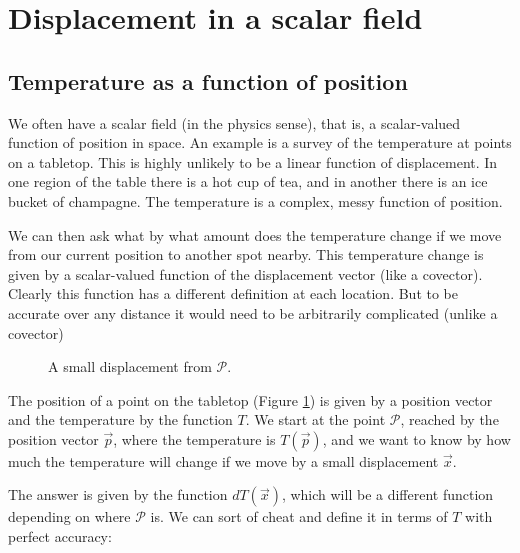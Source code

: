 \section{Displacement in a scalar field}

\subsection{Temperature as a function of position}

We often have a scalar field (in the physics sense), that is, a scalar-valued function of position in space. An example is a survey of the temperature at points on a tabletop. This is highly unlikely to be a linear function of displacement. In one region of the table there is a hot cup of tea, and in another there is an ice bucket of champagne. The temperature is a complex, messy function of position.

We can then ask what by what amount does the temperature change if we move from our current position to another spot nearby. This temperature change is given by a scalar-valued function of the displacement vector (like a covector). Clearly this function has a different definition at each location. But to be accurate over any distance it would need to be arbitrarily complicated (unlike a covector)

\begin{figure}[h]
    \centering
    \caption{A small displacement from $\mathcal{P}$.} \label{fig:vector-displacement}
\end{figure}

The position of a point on the tabletop (Figure \ref{fig:vector-displacement}) is given by a position vector and the temperature by the function $T$. We start at the point $\mathcal{P}$, reached by the position vector $\vec{p}$, where the temperature is $T(\vec{p})$, and we want to know by how much the temperature will change if we move by a small displacement $\vec{x}$.

The answer is given by the function $dT(\vec{x})$, which will be a different function depending on where $\mathcal{P}$ is. We can sort of cheat and define it in terms of $T$ with perfect accuracy:

